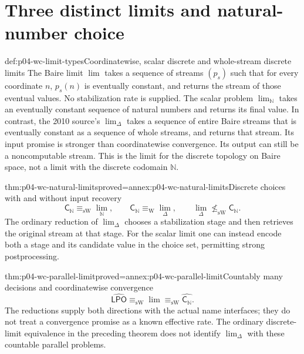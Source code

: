 \section{Three distinct limits and natural-number choice}
\label{sec:p04-wc-limits}

\begin{hbdefinition}{def:p04-wc-limit-types}{Coordinatewise, scalar discrete and whole-stream discrete limits}
The Baire limit \(\lim\) takes a sequence of streams \((p_s)\)
such that for every coordinate \(n\), \(p_s(n)\) is eventually
constant, and returns the stream of those eventual values. No stabilization
rate is supplied.
The scalar problem \(\lim_{\mathbb N}\) takes an eventually
constant sequence of natural numbers and returns its final value.
In contrast, the 2010 source's \(\lim_\Delta\) takes a sequence
of entire Baire streams that is eventually constant as a sequence of
whole streams, and returns that stream. Its input promise is stronger
than coordinatewise convergence. Its output can still be a noncomputable
stream. This is the limit for the discrete topology on Baire space,
not a limit with the discrete codomain \(\mathbb N\).
\end{hbdefinition}

\begin{hbtheorem}{thm:p04-wc-natural-limits}{proved=annex:p04-wc-natural-limits}{Discrete choices with and without input recovery}
\[
 \mathsf{C}_{\mathbb N}\equiv_{\mathrm{sW}}\lim_{\mathbb N},\qquad
 \mathsf{C}_{\mathbb N}\equiv_{\mathrm W}\lim_\Delta,
 \qquad \lim_\Delta\not\leq_{\mathrm{sW}} \mathsf{C}_{\mathbb N}.
\]
The ordinary reduction of \(\lim_\Delta\) chooses a stabilization
stage and then retrieves the original stream at that stage.
For the scalar limit one can instead encode both a stage and its
candidate value in the choice set, permitting strong postprocessing.
\end{hbtheorem}

\begin{hbtheorem}{thm:p04-wc-parallel-limit}{proved=annex:p04-wc-parallel-limit}{Countably many decisions and coordinatewise convergence}
\[
 \widehat{\mathsf{LPO}}\equiv_{\mathrm{sW}}\lim
              \equiv_{\mathrm{sW}}\widehat{\mathsf{C}_{\mathbb N}}.
\]
The reductions supply both directions with the actual name interfaces;
they do not treat a convergence promise as a known effective rate.
The ordinary discrete-limit equivalence in the preceding theorem does
not identify \(\lim_\Delta\) with these countable parallel problems.
\end{hbtheorem}

